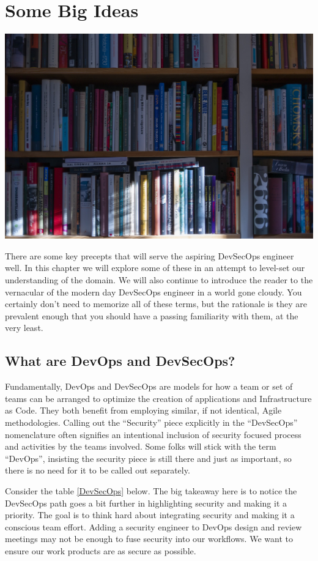 \chapter{Some Big Ideas}

\centering
\includegraphics{images/book-5104342_1920.jpg}

\justify{}
There are some key precepts that will serve the aspiring DevSecOps engineer well. In this
chapter we will explore some of these in an attempt to level-set our understanding of the
domain. We will also continue to introduce the reader to the vernacular of the modern day
DevSecOps engineer in a world gone cloudy. You certainly don't need to memorize all of these terms, but the rationale
is they are prevalent enough that you should have a passing familiarity with them, at the very least.

\section{What are DevOps and DevSecOps?}

\justify{}
Fundamentally, DevOps and DevSecOps are models for how a team or set of teams can be arranged
to optimize the creation of applications and Infrastructure as Code. They both benefit from
employing similar, if not identical, Agile methodologies. Calling out the ``Security''
piece explicitly in the ``DevSecOps'' nomenclature often signifies an intentional inclusion
of security focused process and activities by the teams involved. Some folks will stick with
the term ``DevOps'', insisting the security piece is still there and just as important, so
there is no need for it to be called out separately.

\justify{}
Consider the table \ref{DevSecOps} below. The big takeaway here is to notice the
DevSecOps path goes a bit further
in highlighting security and making it a priority. The goal is to think hard about integrating
security and making it a conscious team effort. Adding a security engineer to DevOps design
and review meetings may not be enough to fuse security into our workflows. We want to ensure
our work products are as secure as possible.

